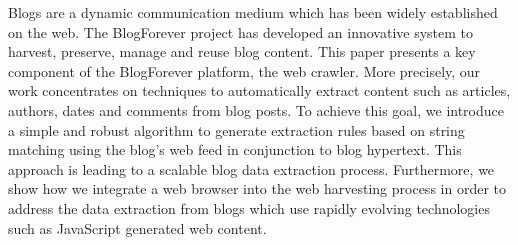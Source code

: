 Blogs are a dynamic communication medium which has been widely established on the web. The BlogForever project has developed an innovative system to harvest, preserve, manage and reuse blog content.
This paper presents a key component of the BlogForever platform, the web crawler. More precisely, our work concentrates on techniques to automatically extract content such as articles, authors, dates and comments from blog posts. 
To achieve this goal, we introduce a simple and robust algorithm to generate extraction rules based on string matching using the blog's web feed in conjunction to blog hypertext. This approach is leading to a scalable blog data extraction process. Furthermore, we show how we integrate a web browser into the web harvesting process in order to address the data extraction from blogs which use rapidly evolving technologies such as JavaScript generated web content.
